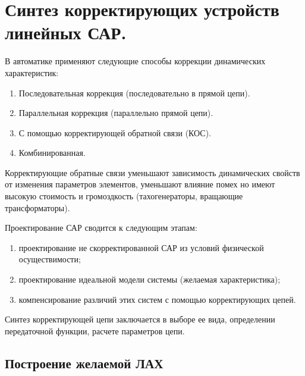 \documentclass[unicode, 12pt, a4paper, oneside]{article}
\begin{document}
\section{Синтез корректирующих устройств линейных САР.}

В автоматике применяют следующие способы коррекции динамических характеристик:
\begin{enumerate}
\item Последовательная коррекция (последовательно в прямой цепи).
\item Параллельная коррекция (параллельно прямой цепи).
\item С помощью корректирующей обратной связи (КОС).
\item Комбинированная.
\end{enumerate}

Корректирующие обратные связи уменьшают зависимость динамических свойств от изменения параметров элементов, уменьшают влияние помех но имеют высокую стоимость и громоздкость (тахогенераторы, вращающие трансформаторы).

Проектирование САР сводится к следующим этапам:
\begin{enumerate}
\item проектирование не скорректированной САР из условий физической осуществимости;
\item проектирование идеальной модели системы (желаемая характеристика);
\item компенсирование различий этих систем с помощью корректирующих цепей.
\end{enumerate}

Синтез корректирующей цепи заключается в выборе ее вида, определении передаточной функции, расчете параметров цепи.

\subsection*{Построение желаемой ЛАХ}
\end{document}

